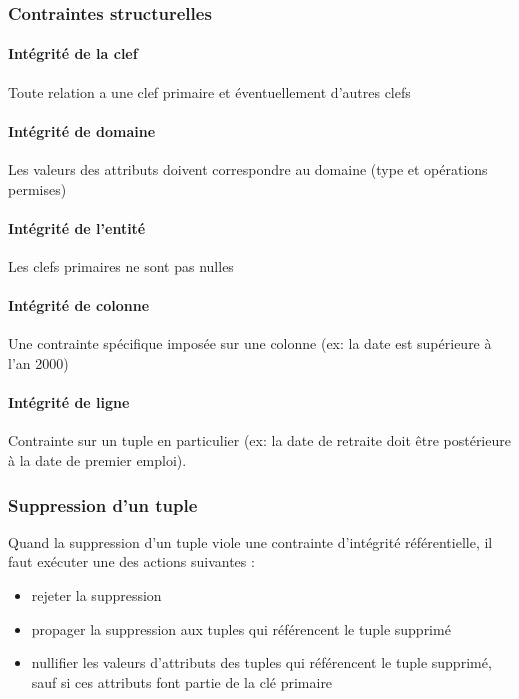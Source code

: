 \documentclass[a4paper]{article}
\begin{document}
\subsubsection{Contraintes structurelles}
\paragraph{Intégrité de la clef}
Toute relation a une clef primaire et éventuellement d'autres clefs

\paragraph{Intégrité de domaine}
Les valeurs des attributs doivent correspondre au domaine (type et opérations permises)

\paragraph{Intégrité de l'entité}
Les clefs primaires ne sont pas nulles

\paragraph{Intégrité de colonne}
Une contrainte spécifique imposée sur une colonne (ex: la date est supérieure à l'an 2000)

\paragraph{Intégrité de ligne}
Contrainte sur un tuple en particulier (ex: la date de retraite doit être postérieure
à la date de premier emploi).

\subsubsection{Suppression d'un tuple}
Quand la suppression d'un tuple viole une contrainte d'intégrité référentielle,
il faut exécuter une des actions suivantes :
\begin{itemize}
  \item rejeter la suppression
  \item propager la suppression aux tuples qui référencent le tuple supprimé
  \item nullifier les valeurs d'attributs des tuples qui référencent le tuple supprimé,
  sauf si ces attributs font partie de la clé primaire
\end{itemize}
\end{document}
